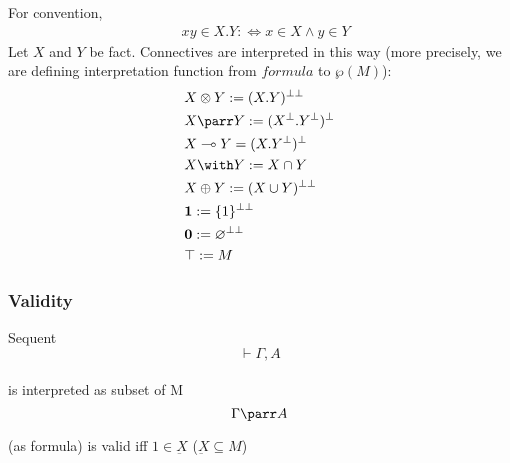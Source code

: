 \documentclass[dvipdfmx,cjk]{beamer}
\theoremstyle{example}
\begin{document}
\begin{frame}
  \begin{definition}
    For convention,
    \begin{align*}
      & xy \in X.Y :\Leftrightarrow x \in X \land y \in Y 
    \end{align*}
    Let $X$ and $Y$ be fact. Connectives are interpreted in this way (more precisely, we are defining interpretation function from $formula$ to $\wp{(M)}$):
    \begin{align*}
     & X \otimes Y := (X.Y)^{\bot\bot} \\
     & X \parr   Y := (X^\bot.Y^\bot)^\bot \\
     & X \multimap Y = (X.Y^\bot)^\bot \\
     & X \with Y := X \cap Y \\
     & X \oplus Y := (X \cup Y)^{\bot\bot} \\
     & \textbf{1} := \{1\}^{\bot\bot} \\
     & \textbf{0} := \varnothing^{\bot\bot} \\
     & \top := M
    \end{align*}
  \end{definition}
\end{frame}

\begin{frame}
  \frametitle{Validity}
  \begin{definition}
    Sequent \\
    \[ \vdash \Gamma, A\] \\
    is interpreted as subset of M \\
    \[ \Gamma \parr A \]
  \end{definition}
  
  \begin{definition}{ (as formula) is valid} iff
    $ 1 \in \underbar{X} $
    ($ \underbar{X} \subseteq M $)
  \end{definition}
\end{frame}
\end{document}
